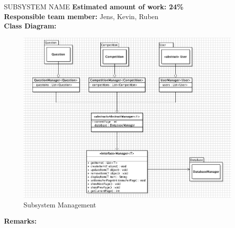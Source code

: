 \begin{subsection}{SUBSYSTEM NAME}
	\textbf{Estimated amount of work: 24\%} \\
	\textbf{Responsible team member:} Jens, Kevin, Ruben \\
	\textbf{Class Diagram:} \\
	
	\begin{figure}[!h]
	    \centering
			\includegraphics[width=1\textwidth]{../class_diagrams/management.png}
	    \caption{Subsystem Management}
	    \label{subsystem_management}
	\end{figure}

	\textbf{Remarks:} \\

\end{subsection}